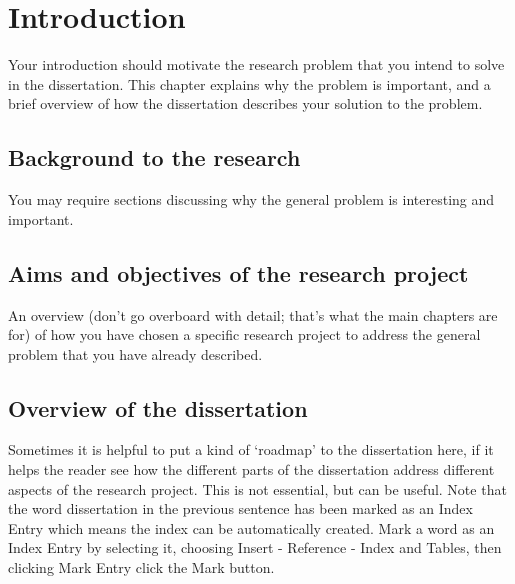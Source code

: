 \chapter{Introduction}
Your introduction should motivate the research problem that you intend to solve in the dissertation. This chapter explains why the problem is important, and a brief overview of how the dissertation describes your solution to the problem.

\section{Background to the research}
You may require sections discussing why the general problem is interesting and important.

\section{Aims and objectives of the research project}
An overview (don’t go overboard with detail; that’s what the main chapters are for) of how you have chosen a specific research project to address the general problem that you have already described.

\section{Overview of the dissertation}
Sometimes it is helpful to put a kind of ‘roadmap’ to the dissertation here, if it helps the reader see how the different parts of the dissertation address different aspects of the research project. This is not essential, but can be useful.
Note that the word dissertation in the previous sentence has been marked as an Index Entry which means the index can be automatically created. Mark a word as an Index Entry by selecting it, choosing Insert - Reference - Index and Tables, then clicking Mark Entry click the Mark button.
